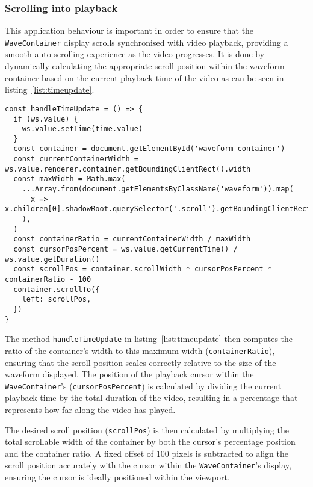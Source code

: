 \subsubsection{Scrolling into playback}
\label{implement:scroll}

This application behaviour is important in order to ensure that the \texttt{WaveContainer} display scrolls synchronised with video playback, providing a smooth auto-scrolling experience as the video progresses. It is done  by dynamically calculating the appropriate scroll position within the waveform container based on the current playback time of the video as can be seen in listing~\ref{list:timeupdate}.

\begin{clisting}
\label{list:timeupdate}
\begin{verbatim}
const handleTimeUpdate = () => {
  if (ws.value) {
    ws.value.setTime(time.value)
  }
  const container = document.getElementById('waveform-container')
  const currentContainerWidth = ws.value.renderer.container.getBoundingClientRect().width
  const maxWidth = Math.max(
    ...Array.from(document.getElementsByClassName('waveform')).map(
      x => x.children[0].shadowRoot.querySelector('.scroll').getBoundingClientRect().width,
    ),
  )
  const containerRatio = currentContainerWidth / maxWidth
  const cursorPosPercent = ws.value.getCurrentTime() / ws.value.getDuration()
  const scrollPos = container.scrollWidth * cursorPosPercent * containerRatio - 100
  container.scrollTo({
    left: scrollPos,
  })
}  
\end{verbatim}
\end{clisting}

The method \texttt{handleTimeUpdate} in listing~\ref{list:timeupdate} then computes the ratio of the container's width to this maximum width (\texttt{containerRatio}), ensuring that the scroll position scales correctly relative to the size of the waveform displayed. The position of the playback cursor within the \texttt{WaveContainer}'s (\texttt{cursorPosPercent}) is calculated by dividing the current playback time by the total duration of the video, resulting in a percentage that represents how far along the video has played.

The desired scroll position (\texttt{scrollPos}) is then calculated by multiplying the total scrollable width of the container by both the cursor's percentage position and the container ratio. A fixed offset of 100 pixels is subtracted to align the scroll position accurately with the cursor within the \texttt{WaveContainer}'s display, ensuring the cursor is ideally positioned within the viewport.

